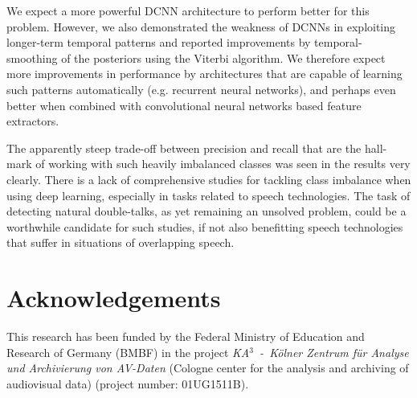 \documentclass[a4paper]{article}
\begin{document}
We expect a more powerful DCNN architecture to perform better for this problem.
However, we also demonstrated the weakness of DCNNs in exploiting longer-term temporal patterns
and reported improvements by temporal-smoothing of the posteriors using the Viterbi algorithm.
We therefore expect more improvements in performance by architectures that are capable of learning such patterns automatically (e.g. recurrent neural networks),
and perhaps even better when combined with convolutional neural networks based feature extractors.

The apparently steep trade-off between precision and recall that are the hall-mark of working with such heavily imbalanced classes was seen in the results very clearly.
There is a lack of comprehensive studies for tackling class imbalance when using deep learning,
especially in tasks related to speech technologies.
The task of detecting natural double-talks, as yet remaining an unsolved problem,
could be a worthwhile candidate for such studies,
if not also benefitting speech technologies that suffer in situations of overlapping speech.


\section{Acknowledgements}
This research has been funded by the Federal Ministry of Education and Research of Germany (BMBF) in the project \textit{KA$^3$~-~K{\"o}lner Zentrum für Analyse und Archivierung von AV-Daten} (Cologne center for the analysis and archiving of audiovisual data) (project number: 01UG1511B).



\end{document}
